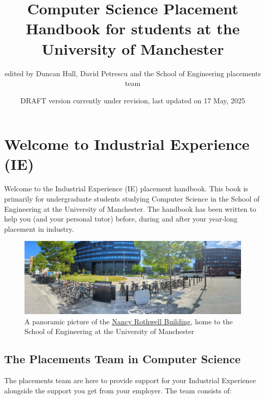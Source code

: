 \documentclass[
]{book}
\title{Computer Science Placement Handbook for students at the University of Manchester}
\author{edited by Duncan Hull, David Petrescu and the School of Engineering placements team}
\date{DRAFT version currently under revision, last updated on 17 May, 2025}
\begin{document}
\maketitle

{
\setcounter{tocdepth}{1}
\tableofcontents
}
\chapter*{Welcome to Industrial Experience (IE)}\label{welcome-to-industrial-experience-ie}

Welcome to the Industrial Experience (IE) placement handbook. This book is primarily for undergraduate students studying Computer Science in the School of Engineering at the University of Manchester. The handbook has been written to help you (and your personal tutor) before, during and after your year-long placement in industry.

\begin{figure}

{\centering \includegraphics[width=1\linewidth]{images/rothwell} 

}

\caption{A panoramic picture of the \href{https://en.wikipedia.org/wiki/Nancy_Rothwell_Building}{Nancy Rothwell Building}, home to the School of Engineering at the University of Manchester}\label{fig:engineering-fig}
\end{figure}



\section{The Placements Team in Computer Science}\label{team}

The placements team are here to provide support for your Industrial Experience alongside the support you get from your employer. The team consists of:
\end{document}
